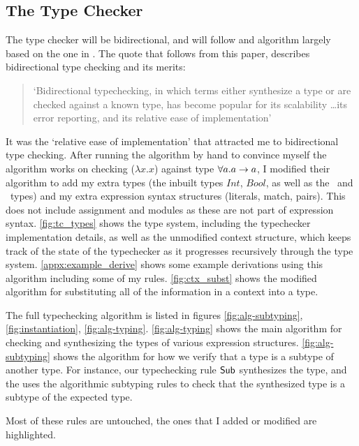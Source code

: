 \subsection{The Type Checker}
The type checker will be bidirectional, and will follow and algorithm largely based on the one in \cite{completebidir}. The quote that follows from this paper, describes bidirectional type checking and its merits:
\begin{quote}
`Bidirectional typechecking, in which terms either synthesize a type or are checked against a known type, has become popular for its scalability \ldots its error reporting, and its relative ease of implementation' \cite{completebidir}
\end{quote}
\noindent It was the `relative ease of implementation' that attracted me to bidirectional type checking. After running the algorithm by hand to convince myself the algorithm works on checking  ($\lambda x. x$) against type $\forall a.a\rightarrow a$, I modified their algorithm to add my extra types (the inbuilt types $Int$, $Bool$, as well as the \Uniontype\ and \Producttype\ types) and my extra expression syntax structures (literals, match, pairs). This does not include assignment and modules as these are not part of expression syntax. \ref{fig:tc_types} shows the type system, including the typechecker implementation details, as well as the unmodified context structure, which keeps track of the state of the typechecker as it progresses recursively through the type system. \ref{appx:example_derive} shows some example derivations using this algorithm including some of my rules. \ref{fig:ctx_subst} shows the modified algorithm for substituting all of the information in a context into a type. 



The full typechecking algorithm is listed in figures \ref{fig:alg-subtyping}, \ref{fig:instantiation}, \ref{fig:alg-typing}. \ref{fig:alg-typing} shows the main algorithm for checking and synthesizing the types of various expression structures. \ref{fig:alg-subtyping} shows the algorithm for how we verify that a type is a subtype of another type. For instance, our typechecking rule $\text{\normalfont\textsf{Sub}}$ synthesizes the type, and the uses the algorithmic subtyping rules to check that the synthesized type is a subtype of the expected type. 

Most of these rules are untouched, the ones that I added or modified are \colorbox{myTcRuleColour}{highlighted}.






